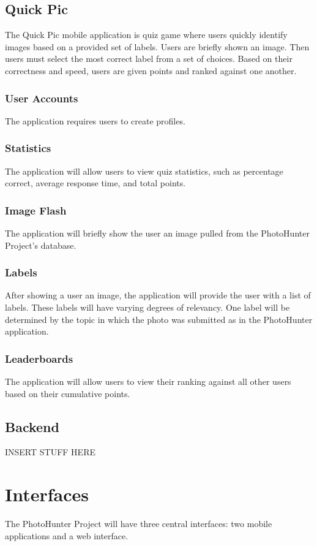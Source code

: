 \documentclass{article}
\begin{document}
\subsection{Quick Pic}
The Quick Pic mobile application is quiz game where users quickly identify images based on a provided set of labels. Users are briefly shown an image. Then users must select the most correct label from a set of choices. Based on their correctness and speed, users are given points and ranked against one another.

	\subsubsection{User Accounts}
	The application requires users to create profiles. 
	
	\subsubsection{Statistics}
	The application will allow users to view quiz statistics, such as percentage correct, average response time, and total points.
	
	\subsubsection{Image Flash}
	The application will briefly show the user an image pulled from the PhotoHunter Project's database.
	
	\subsubsection{Labels}
	After showing a user an image, the application will provide the user with a list of labels. These labels will have varying degrees of relevancy. One label will be determined by the topic in which the photo was submitted as in the PhotoHunter application. 
	
	\subsubsection{Leaderboards}
	The application will allow users to view their ranking against all other users based on their cumulative points.
	
\subsection{Backend}
INSERT STUFF HERE

\section{Interfaces}
The PhotoHunter Project will have three central interfaces: two mobile applications and a web interface.
\end{document}
